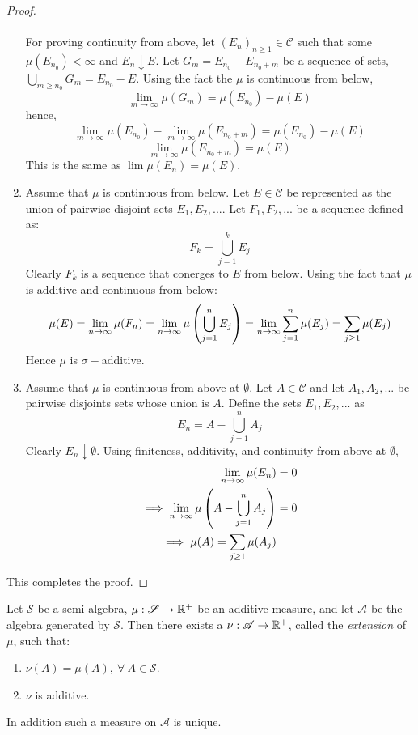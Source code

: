 \begin{proof}
\begin{enumerate}
      \paragraph{} For proving continuity from above, let $(E_n)_{n\geq 1}\in \mathscr{C}$ such that some $\mu(E_{n_0}) <\infty$ and $E_n \downarrow E$. Let $G_m = E_{n_0} - E_{n_0+m}$ be a sequence of sets, $\bigcup_{m\geq n_0} G_m = E_{n_0} - E$. Using the fact the $\mu$ is continuous from below,
      \[\lim_{m\to\infty}\mu(G_m) = \mu(E_{n_0}) - \mu(E)\]
      hence,
      \[\lim_{m\to\infty}\mu(E_{n_0}) - \lim_{m\to\infty}\mu(E_{n_0+m}) = \mu(E_{n_0}) - \mu(E)\]
      \[\lim_{m\to\infty}\mu(E_{n_0+m}) = \mu(E)\]
      This is the same as $\lim \mu(E_n) = \mu(E)$.
    \item Assume that $\mu$ is continuous from below. Let $E\in \mathscr{C}$ be represented as the union of pairwise disjoint sets $E_1, E_2,...$. Let $F_1,F_2,...$ be a sequence defined as:
      \[F_k = \bigcup_{j=1}^{k} E_j\]
      Clearly $F_k$ is a sequence that conerges to $E$ from below. Using the fact that $\mu$ is additive and continuous from below:
      \[\mu(E) = \lim_{n\to\infty}\mu(F_n) = \lim_{n\to\infty} \mu\left(\bigcup_{j=1}^n E_j\right) = \lim_{n\to\infty}\sum_{j=1}^{n}\mu(E_j) = \sum_{j\geq 1}\mu(E_j)\]
      Hence $\mu$ is $\sigma-$additive.
    \item Assume that $\mu$ is continuous from above at $\emptyset$. Let $A\in \mathscr{C}$ and let $A_1, A_2,...$ be pairwise disjoints sets whose union is $A$. Define the sets $E_1, E_2,...$ as
      \[E_n = A - \bigcup_{j=1}^nA_j\]
      Clearly $E_n\downarrow \emptyset$. Using finiteness, additivity, and continuity from above at $\emptyset$,
      \begin{align*}
        \lim_{n\to\infty}\mu(E_n) &= 0\\
        \implies \lim_{n\to\infty} \mu\left(A - \bigcup_{j=1}^nA_j\right) &= 0\\
        \implies \mu(A) = \sum_{j\geq 1} \mu(A_j)
      \end{align*}
  \end{enumerate}
  This completes the proof.
\end{proof}
\begin{theorem}\label{thm:extension}
  Let $ \mathscr{S}$ be a semi-algebra, $\mu: \mathscr{S}\to \mathbb{R}^+$ be an additive measure, and let $ \mathscr{A}$ be the algebra generated by $ \mathscr{S}$. Then there exists a $\nu: \mathscr{A}\to \mathbb{R}^+$, called the \textit{extension} of $\mu$, such that:
  \begin{enumerate}
    \item $\nu(A) = \mu(A),\ \forall\ A\in \mathscr{S}$.
    \item $\nu$ is additive.
  \end{enumerate}
  In addition such a measure on $ \mathscr{A}$ is unique.  
\end{theorem}
